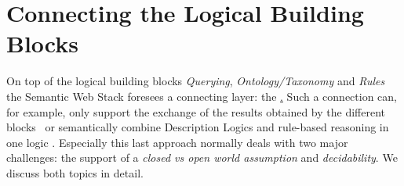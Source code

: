 

%





\section{Connecting the Logical Building Blocks}
On top of the logical building blocks \emph{Querying}, \emph{Ontology/Taxonomy} and \emph{Rules} the Semantic Web Stack foresees a connecting layer: 
the \ul. 
Such a connection can, for example, only support the exchange of the results obtained by the different blocks~\cite{kifer2005} 
or semantically combine Description Logics and rule-based reasoning in one logic \cite{DLP,knorr,unilogic,DLASP,owlandrules}. 
Especially this last approach normally deals with two major challenges: 
the support of a \emph{closed vs open world assumption} and \emph{decidability}. We discuss both topics in detail.


